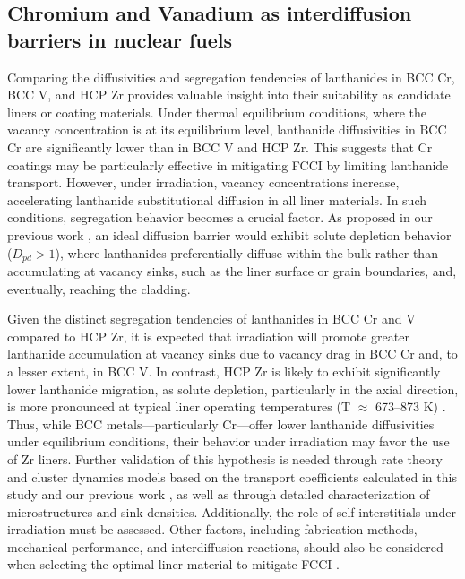 \documentclass[preprint,12pt]{elsarticle}
\begin{document}
\subsection{Chromium and Vanadium as interdiffusion barriers in nuclear fuels}
Comparing the diffusivities and segregation tendencies of lanthanides in BCC Cr, BCC V, and HCP Zr provides valuable insight into their suitability as candidate liners or coating materials. Under thermal equilibrium conditions, where the vacancy concentration is at its equilibrium level, lanthanide diffusivities in BCC Cr are significantly lower than in BCC V and HCP Zr. This suggests that Cr coatings may be particularly effective in mitigating FCCI by limiting lanthanide transport. However, under irradiation, vacancy concentrations increase, accelerating lanthanide substitutional diffusion in all liner materials. In such conditions, segregation behavior becomes a crucial factor. As proposed in our previous work \citep{shousha2024first}, an ideal diffusion barrier would exhibit solute depletion behavior ($D_{pd} > 1$), where lanthanides preferentially diffuse within the bulk rather than accumulating at vacancy sinks, such as the liner surface or grain boundaries, and, eventually, reaching the cladding.

Given the distinct segregation tendencies of lanthanides in BCC Cr and V compared to HCP Zr, it is expected that irradiation will promote greater lanthanide accumulation at vacancy sinks due to vacancy drag in BCC Cr and, to a lesser extent, in BCC V. In contrast, HCP Zr is likely to exhibit significantly lower lanthanide migration, as solute depletion, particularly in the axial direction, is more pronounced at typical liner operating temperatures (T $\approx$ 673–873 K) \citep{beausoleil_fast_2022}. Thus, while BCC metals—particularly Cr—offer lower lanthanide diffusivities under equilibrium conditions, their behavior under irradiation may favor the use of Zr liners. Further validation of this hypothesis is needed through rate theory and cluster dynamics models based on the transport coefficients calculated in this study and our previous work \citep{shousha2024first}, as well as through detailed characterization of microstructures and sink densities. Additionally, the role of self-interstitials under irradiation must be assessed. Other factors, including fabrication methods, mechanical performance, and interdiffusion reactions, should also be considered when selecting the optimal liner material to mitigate FCCI \cite{OH2024113102}.

\FloatBarrier
\end{document}
